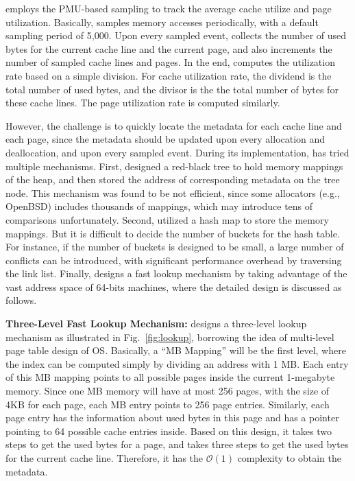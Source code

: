 \MP{} employs the PMU-based sampling to track the average cache utilize and page utilization. Basically, \MP{} samples memory accesses periodically, with a default sampling period of 5,000. Upon every sampled event, \MP{} collects the number of used bytes for the current cache line and the current page, and also increments the number of sampled cache lines and pages. In the end, \MP{} computes the utilization rate  based on a simple division. For cache utilization rate, the dividend is the total number of used bytes, and the divisor is the the total number of bytes for these cache lines. The page utilization rate is computed similarly. 

However, the challenge is to quickly locate the  metadata for each cache line and each page, since the metadata should be updated upon every allocation and deallocation, and upon every sampled event. During its implementation, \MP{} has tried multiple mechanisms. First, \MP{} designed a red-black tree to hold memory mappings of the heap, and then stored the address of corresponding metadata on the tree node. This mechanism was found to be not efficient, since some allocators (e.g., OpenBSD) includes thousands of mappings, which may introduce tens of comparisons unfortunately. Second, \MP{} utilized a hash map to store the memory mappings. But it is difficult to decide the number of buckets for the hash table. For instance, if the number of buckets is designed to be small,  a large number of conflicts can be introduced, with significant performance overhead by traversing the link list.  Finally, \MP{} designs a fast lookup mechanism by taking advantage of the vast address space of 64-bits machines, where the detailed design is discussed as follows. 


\textbf{Three-Level Fast Lookup Mechanism:} \MP{} designs a three-level lookup mechanism as illustrated in Fig.~\ref{fig:lookup}, borrowing the idea of multi-level page table design of OS. Basically, a ``MB Mapping'' will be the first level, where the index can be computed simply by dividing an address with 1 MB. Each entry of this MB mapping points to all possible pages inside the current 1-megabyte memory. Since one MB memory will have at most 256 pages, with the size of 4KB for each page, each MB entry points to 256 page entries. Similarly, each page entry has the information about used bytes in this page and has a pointer pointing to 64 possible cache entries inside. Based on this design, it takes two steps to get the used bytes for a page, and takes three steps to get the used bytes for the current cache line. Therefore, it has the $\mathcal{O}(1)$ 
complexity to obtain the metadata.  
          
